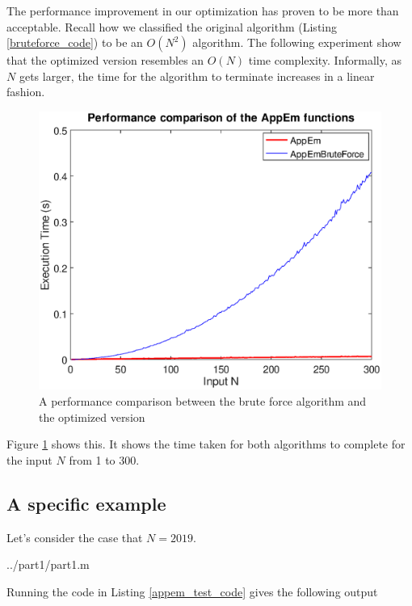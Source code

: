 \documentclass[10pt]{article}
\begin{document}
The performance improvement in our optimization has proven to be more than acceptable. Recall how we classified the original algorithm (Listing \ref{bruteforce_code}) to be an $O(N^2)$ algorithm. The following experiment show that the optimized version resembles an $O(N)$ time complexity. Informally, as $N$ gets larger, the time for the algorithm to terminate increases in a linear fashion.

\begin{figure}[ht]

   \includegraphics[scale=0.6]{bruteforce_vs_better.eps}

   \caption{A performance comparison between the brute force algorithm and the optimized version}
      \label{fig:emnaive_vs_better}
\end{figure}


Figure \ref{fig:emnaive_vs_better} shows this. It shows the time taken for both algorithms to complete for the input $N$ from 1 to 300.


\subsection{A specific example}

Let's consider the case that $N = 2019$. 

   {../part1/part1.m}
  
Running the code in Listing \ref{appem_test_code} gives the following output
\end{document}
